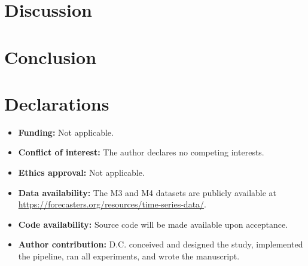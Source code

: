 \documentclass[pdflatex,sn-mathphys-num]{sn-jnl}
\theoremstyle{thmstyleone}
\theoremstyle{thmstyletwo}
\theoremstyle{thmstylethree}
\begin{document}
\section{Discussion}\label{sec:discussion}

\section{Conclusion}\label{sec:conclusion}

\backmatter


\section*{Declarations}

\begin{itemize}
  \item \textbf{Funding:} Not applicable.
  \item \textbf{Conflict of interest:} The author declares no competing interests.
  \item \textbf{Ethics approval:} Not applicable.
  \item \textbf{Data availability:} The M3 and M4 datasets are publicly available
    at \url{https://forecasters.org/resources/time-series-data/}.
  \item \textbf{Code availability:} Source code will be made available upon
    acceptance.
  \item \textbf{Author contribution:} D.C. conceived and designed the study,
    implemented the pipeline, ran all experiments, and wrote the manuscript.
\end{itemize}


\end{document}
